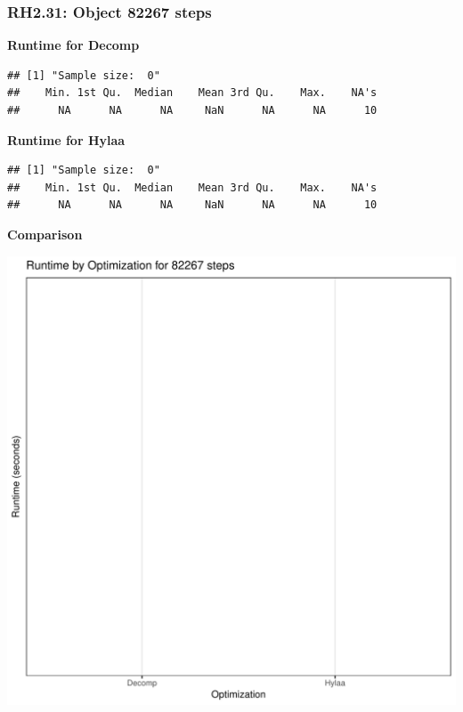 \documentclass{article}\usepackage[]{graphicx}\usepackage[]{color}
\makeatletter
\def\maxwidth{ %
  \ifdim\Gin@nat@width>\linewidth
    \linewidth
  \else
    \Gin@nat@width
  \fi
}
\newenvironment{kframe}{%
 \def\at@end@of@kframe{}%
 \ifinner\ifhmode%
  \def\at@end@of@kframe{\end{minipage}}%
  \begin{minipage}{\columnwidth}%
 \fi\fi%
 \def\FrameCommand##1{\hskip\@totalleftmargin \hskip-\fboxsep
 \colorbox{shadecolor}{##1}\hskip-\fboxsep
     \hskip-\linewidth \hskip-\@totalleftmargin \hskip\columnwidth}%
 \MakeFramed {\advance\hsize-\width
   \@totalleftmargin\z@ \linewidth\hsize
   \@setminipage}}%
 {\par\unskip\endMakeFramed%
 \at@end@of@kframe}
\newenvironment{knitrout}{}{} %
\makeatother
\begin{document}
\subsubsection{RH2.31: Object 82267 steps}

 \textbf{Runtime for Decomp}
\begin{knitrout}
\color{fgcolor}\begin{kframe}
\begin{verbatim}
## [1] "Sample size:  0"
##    Min. 1st Qu.  Median    Mean 3rd Qu.    Max.    NA's 
##      NA      NA      NA     NaN      NA      NA      10
\end{verbatim}
\end{kframe}
\end{knitrout}
 \textbf{Runtime for Hylaa}
\begin{knitrout}
\color{fgcolor}\begin{kframe}
\begin{verbatim}
## [1] "Sample size:  0"
##    Min. 1st Qu.  Median    Mean 3rd Qu.    Max.    NA's 
##      NA      NA      NA     NaN      NA      NA      10
\end{verbatim}
\end{kframe}
\end{knitrout}
  
 \textbf{Comparison}
  
\begin{knitrout}
\color{fgcolor}
\includegraphics[width=\maxwidth]{figure/RH2_steps82267-1} 

\end{knitrout}
\end{document}
